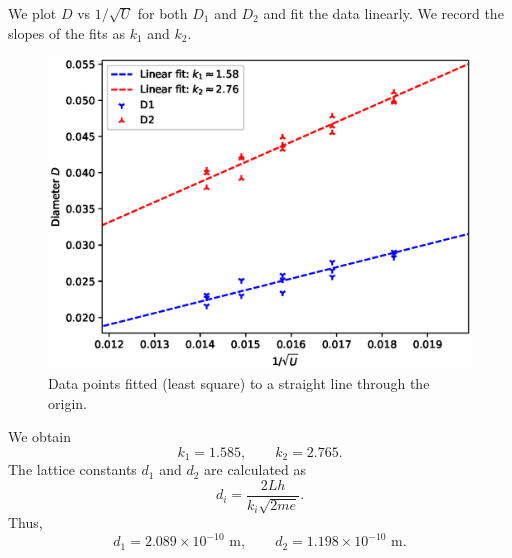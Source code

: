 \documentclass[11pt]{article}
\begin{document}
        We plot $D$ vs $1 /\sqrt{U}$ for both $D_1$ and $D_2$ and fit the data linearly. We record the slopes of the fits as $k_1$ and $k_2$.
        \begin{figure}[H]
        \centering
        \includegraphics[scale=1.0]{./linear_fit.eps}
        \caption{Data points fitted (least square) to a straight line through the origin.}
        \label{fig:fit}
        \end{figure}

        We obtain
        \[
                k_1 = 1.585, \qquad k_2 = 2.765.
        \]
        The lattice constants $d_1$ and $d_2$ are calculated as
        \[
                d_i = \frac{2Lh}{k_i\sqrt{2me}}.
        \]
        Thus,
        \[
                d_1 = 2.089 \times 10^{-10}\text{ m}, \qquad d_2 = 1.198 \times 10^{-10}\text{ m}.
        \]
\end{document}
